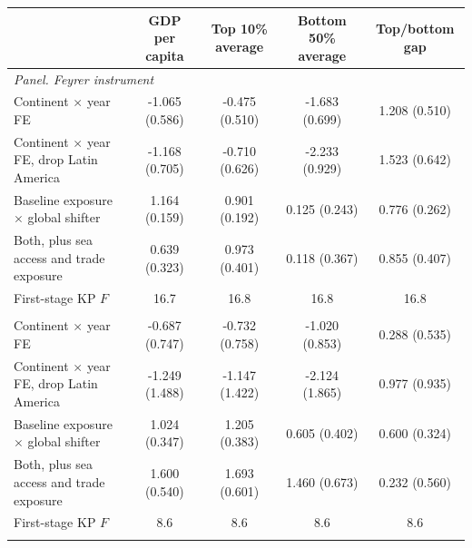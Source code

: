 \begin{tabular}{lcccc}
\toprule
 & GDP per capita & Top 10\% average & Bottom 50\% average & Top/bottom gap \\
\midrule
\multicolumn{5}{l}{\emph{Panel. Feyrer instrument}}\\
Continent $\times$ year FE & -1.065\sym{*} (0.586) & -0.475 (0.510) & -1.683\sym{**} (0.699) & 1.208\sym{**} (0.510) \\
Continent $\times$ year FE, drop Latin America & -1.168\sym{*} (0.705) & -0.710 (0.626) & -2.233\sym{**} (0.929) & 1.523\sym{**} (0.642) \\
Baseline exposure $\times$ global shifter & 1.164\sym{***} (0.159) & 0.901\sym{***} (0.192) & 0.125 (0.243) & 0.776\sym{***} (0.262) \\
Both, plus sea access and trade exposure & 0.639\sym{**} (0.323) & 0.973\sym{**} (0.401) & 0.118 (0.367) & 0.855\sym{**} (0.407) \\
First-stage KP $F$ & 16.7 & 16.8 & 16.8 & 16.8 \\
\addlinespace
\multicolumn{5}{l}{\emph{Panel. Tourism-heritage instrument}}\\
Continent $\times$ year FE & -0.687 (0.747) & -0.732 (0.758) & -1.020 (0.853) & 0.288 (0.535) \\
Continent $\times$ year FE, drop Latin America & -1.249 (1.488) & -1.147 (1.422) & -2.124 (1.865) & 0.977 (0.935) \\
Baseline exposure $\times$ global shifter & 1.024\sym{***} (0.347) & 1.205\sym{***} (0.383) & 0.605 (0.402) & 0.600\sym{*} (0.324) \\
Both, plus sea access and trade exposure & 1.600\sym{***} (0.540) & 1.693\sym{***} (0.601) & 1.460\sym{**} (0.673) & 0.232 (0.560) \\
First-stage KP $F$ & 8.6 & 8.6 & 8.6 & 8.6 \\
\addlinespace
\bottomrule
\end{tabular}